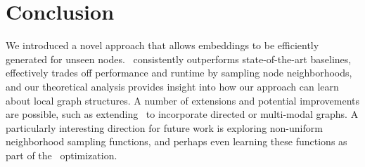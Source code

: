 
\section{Conclusion}

We introduced a novel approach that allows embeddings to be efficiently generated for unseen nodes. 
\name\ consistently outperforms state-of-the-art baselines, effectively trades off performance and runtime by sampling node neighborhoods, and our theoretical analysis provides insight into how our approach can learn about local graph structures. 
A number of extensions and potential improvements are possible, such as extending \name\ to incorporate directed or multi-modal graphs. 
A particularly interesting direction for future work is exploring non-uniform neighborhood sampling functions, and perhaps even learning these functions as part of the \name\ optimization. 

